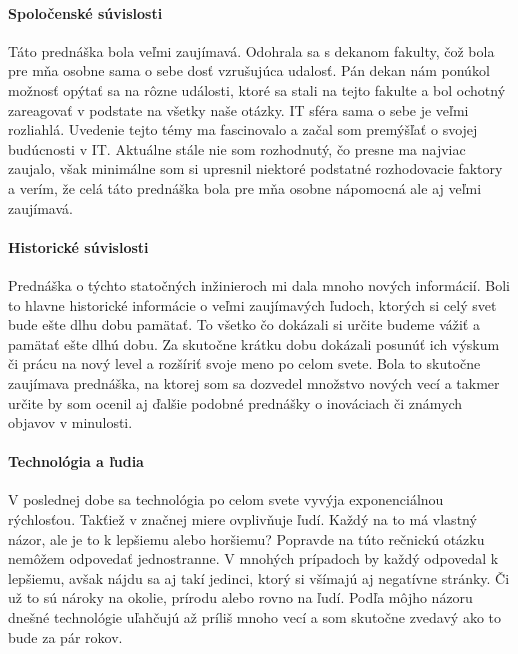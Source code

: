 \documentclass[10pt,twoside,slovak,a4paper]{article}
\begin{document}








\paragraph{Spoločenské súvislosti}
Táto prednáška bola veľmi zaujímavá. Odohrala sa s dekanom fakulty, čož bola pre mňa osobne sama o sebe dosť vzrušujúca udalosť. Pán dekan nám ponúkol možnosť opýtať sa na rôzne události, ktoré sa stali na tejto fakulte a bol ochotný zareagovať v podstate na všetky naše otázky. IT sféra sama o sebe je veľmi rozliahlá. Uvedenie tejto témy ma fascinovalo a začal som premýšľať o svojej budúcnosti v IT. Aktuálne stále nie som rozhodnutý, čo presne ma najviac zaujalo, však minimálne som si upresnil niektoré podstatné rozhodovacie faktory a verím, že celá táto prednáška bola pre mňa osobne nápomocná ale aj veľmi zaujímavá.

\paragraph{Historické súvislosti}
Prednáška o týchto statočných inžinieroch mi dala mnoho nových informácií. Boli to hlavne historické informácie o veľmi zaujímavých ľudoch, ktorých si celý svet bude ešte dlhu dobu pamätať. To všetko čo dokázali si určite budeme vážiť a pamätať ešte dlhú dobu. Za skutočne krátku dobu dokázali posunúť ich výskum či prácu na nový level a rozšíriť svoje meno po celom svete. Bola to skutočne zaujímava prednáška, na ktorej som sa dozvedel množstvo nových vecí a takmer určite by som ocenil aj ďalšie podobné prednášky o inováciach či známych objavov v minulosti.

\paragraph{Technológia a ľudia}
V poslednej dobe sa technológia po celom svete vyvýja exponenciálnou rýchlosťou. Takťiež v značnej miere ovplivňuje ľudí. Každý na to má vlastný názor, ale je to k lepšiemu alebo horšiemu? Popravde na túto rečnickú otázku nemôžem odpovedať jednostranne. V mnohých prípadoch by každý odpovedal k lepšiemu, avšak nájdu sa aj takí jedinci, ktorý si všímajú aj negatívne stránky. Či už to sú nároky na okolie, prírodu alebo rovno na ľudí. Podľa môjho názoru dnešné technológie uľahčujú až príliš mnoho vecí a som skutočne zvedavý ako to bude za pár rokov.
\end{document}
